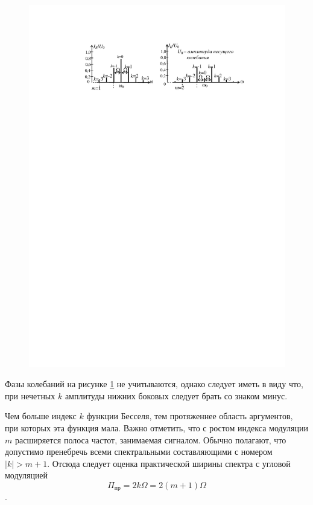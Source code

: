 \begin{figure}[H]
	\centering
	\includegraphics[]{fig/fig2-6}
	\caption{}
	\label{fig:2.6}
\end{figure}
Фазы колебаний на рисунке \ref{fig:2.6} не учитываются, однако следует иметь в виду что, при нечетных $k$ амплитуды нижних боковых следует брать со знаком минус. 

Чем больше индекс $k$ функции Бесселя, тем протяженнее область аргументов, при которых эта функция мала. Важно отметить, что с ростом индекса модуляции $m$ расширяется полоса частот, занимаемая сигналом. Обычно полагают, что допустимо пренебречь всеми спектральными составляющими с номером $|k|>m+1$. Отсюда следует оценка практической ширины спектра с угловой модуляцией 
\begin{equation}
	\Pi_\text{пр}=2k\Omega=2(m+1)\Omega
	\label{eq:ocenka}
\end{equation}.


